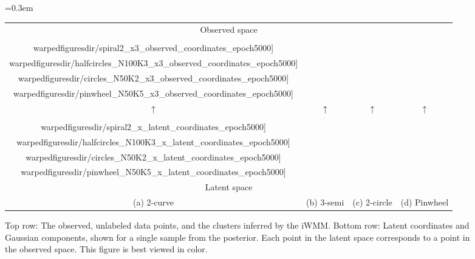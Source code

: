 %
\begin{figure*}%
\centering
{\tabcolsep=0.3em
\begin{tabular}{cccc}
\multicolumn{4}{c}{Observed space} \\
\fbox{\texttt{[image: \\warpedfiguresdir/spiral2\_x3\_observed\_coordinates\_epoch5000]}}
&
\fbox{\texttt{[image: \\warpedfiguresdir/halfcircles\_N100K3\_x3\_observed\_coordinates\_epoch5000]}}
&
\fbox{\texttt{[image: \\warpedfiguresdir/circles\_N50K2\_x3\_observed\_coordinates\_epoch5000]}}
&
\fbox{\texttt{[image: \\warpedfiguresdir/pinwheel\_N50K5\_x3\_observed\_coordinates\_epoch5000]}}\\
$\uparrow$ & $\uparrow$ & $\uparrow$ & $\uparrow$ \\ 
\fbox{\texttt{[image: \\warpedfiguresdir/spiral2\_x\_latent\_coordinates\_epoch5000]}}
&
\fbox{\texttt{[image: \\warpedfiguresdir/halfcircles\_N100K3\_x\_latent\_coordinates\_epoch5000]}}
&
\fbox{\texttt{[image: \\warpedfiguresdir/circles\_N50K2\_x\_latent\_coordinates\_epoch5000]}}
&
\fbox{\texttt{[image: \\warpedfiguresdir/pinwheel\_N50K5\_x\_latent\_coordinates\_epoch5000]}}
\\
\multicolumn{4}{c}{Latent space} \\
(a) 2-curve & (b) 3-semi & (c) 2-circle & (d) Pinwheel \\
\end{tabular}}
\caption{
Top row: The observed, unlabeled data points, and the clusters inferred by the iWMM.
Bottom row: Latent coordinates and Gaussian components, shown for a single sample from the posterior.
Each point in the latent space corresponds to a point in the observed space. This figure is best viewed in color.}
\label{fig:warping}
\end{figure*}

